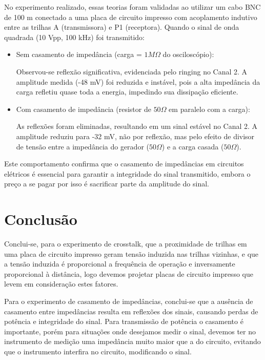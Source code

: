 \documentclass[12pt]{article}
\begin{document}
No experimento realizado, essas teorias foram validadas ao utilizar
um cabo BNC de 100 m conectado a uma placa de circuito impresso com
acoplamento indutivo entre as trilhas A (transmissora) e P1
(receptora). Quando o sinal de onda quadrada (10 Vpp, 100 kHz) foi transmitido:

\begin{itemize}
  \item Sem casamento de impedância (carga = $1M\Omega$ do osciloscópio):

    Observou-se reflexão significativa, evidenciada pelo ringing no Canal
    2. A amplitude medida (-48 mV) foi reduzida e instável, pois a alta
    impedância da carga refletiu quase toda a energia, impedindo sua
    dissipação eficiente.

  \item Com casamento de impedância (resistor de $50\Omega$ em
    paralelo com a carga):

    As reflexões foram eliminadas, resultando em um sinal estável no
    Canal 2. A amplitude reduziu para -32 mV, não por reflexão, mas
    pelo efeito de divisor de tensão entre a impedância do gerador
    ($50\Omega$) e a carga casada ($50\Omega$).
\end{itemize}

Este comportamento confirma que o casamento de impedâncias em
circuitos elétricos é essencial para garantir a integridade do sinal
transmitido, embora o preço a se pagar por isso é sacrificar parte da
amplitude do sinal.

\section{Conclusão}
Conclui-se, para o experimento de crosstalk, que a proximidade de
trilhas em uma placa de circuito
impresso geram tensão induzida nas trilhas vizinhas, e que a tensão
induzida é proporcional a frequência de operação e inversamente
proporcional à distância, logo devemos projetar placas de circuito
impresso que levem em consideração estes fatores.

Para o experimento de casamento de impedâncias, conclui-se que a ausência de
casamento entre impedâncias resulta em reflexões dos sinais, causando perdas 
de potência e integridade do sinal. Para transmissão de potência o casamento é 
importante, porém para situações onde desejamos medir o sinal, devemos ter
no instrumento de medição uma impedância muito maior que a do circuito, evitando
que o instrumento interfira no circuito, modificando o sinal.
\end{document}
